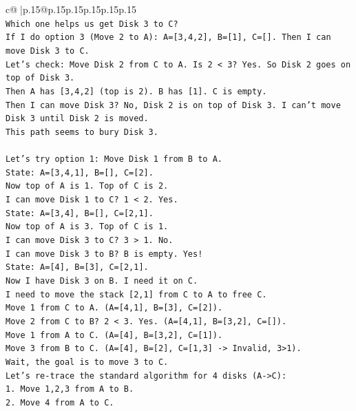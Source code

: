 \documentclass{article}
\begin{document}
{\begin{supertabular}{c@{$\;$}|p{.15\linewidth}@{}p{.15\linewidth}p{.15\linewidth}p{.15\linewidth}p{.15\linewidth}p{.15\linewidth}}
{{{\\ 
\texttt{Which one helps us get Disk 3 to C?} \\
\texttt{If I do option 3 (Move 2 to A): A={[}3,4,2{]}, B={[}1{]}, C={[}{]}. Then I can move Disk 3 to C.} \\
\texttt{Let's check: Move Disk 2 from C to A. Is 2 < 3? Yes. So Disk 2 goes on top of Disk 3.} \\
\texttt{Then A has {[}3,4,2{]} (top is 2). B has {[}1{]}. C is empty.} \\
\texttt{Then I can move Disk 3? No, Disk 2 is on top of Disk 3. I can't move Disk 3 until Disk 2 is moved.} \\
\texttt{This path seems to bury Disk 3.} \\
\\ 
\texttt{Let's try option 1: Move Disk 1 from B to A.} \\
\texttt{State: A={[}3,4,1{]}, B={[}{]}, C={[}2{]}.} \\
\texttt{Now top of A is 1. Top of C is 2.} \\
\texttt{I can move Disk 1 to C? 1 < 2. Yes.} \\
\texttt{State: A={[}3,4{]}, B={[}{]}, C={[}2,1{]}.} \\
\texttt{Now top of A is 3. Top of C is 1.} \\
\texttt{I can move Disk 3 to C? 3 > 1. No.} \\
\texttt{I can move Disk 3 to B? B is empty. Yes!} \\
\texttt{State: A={[}4{]}, B={[}3{]}, C={[}2,1{]}.} \\
\texttt{Now I have Disk 3 on B. I need it on C.} \\
\texttt{I need to move the stack {[}2,1{]} from C to A to free C.} \\
\texttt{Move 1 from C to A. (A={[}4,1{]}, B={[}3{]}, C={[}2{]}).} \\
\texttt{Move 2 from C to B? 2 < 3. Yes. (A={[}4,1{]}, B={[}3,2{]}, C={[}{]}).} \\
\texttt{Move 1 from A to C. (A={[}4{]}, B={[}3,2{]}, C={[}1{]}).} \\
\texttt{Move 3 from B to C. (A={[}4{]}, B={[}2{]}, C={[}1,3{]} {-}> Invalid, 3>1).} \\
\texttt{Wait, the goal is to move 3 to C.} \\
\texttt{Let's re{-}trace the standard algorithm for 4 disks (A{-}>C):} \\
\texttt{1. Move 1,2,3 from A to B.} \\
\texttt{2. Move 4 from A to C.} \\
}}}
\end{supertabular}}
\end{document}
